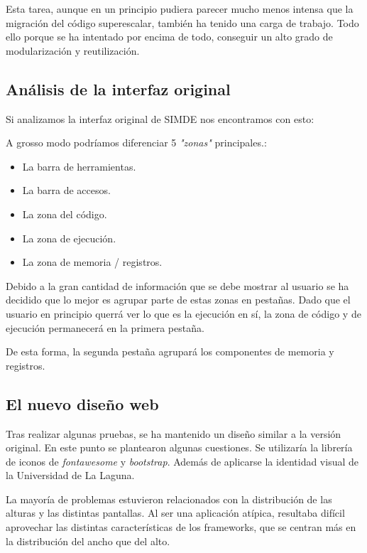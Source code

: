 Esta tarea, aunque en un principio pudiera parecer mucho menos intensa que la migración del código 
superescalar, también ha tenido una carga de trabajo. Todo ello porque se ha intentado por encima 
de todo, conseguir un alto grado de modularización y reutilización. 

\subsection{Análisis de la interfaz original}

Si analizamos la interfaz original de SIMDE nos encontramos con esto: 

A grosso modo podríamos diferenciar 5 \textit{"zonas"} principales.:

\begin{itemize}

\item La barra de herramientas.

\item La barra de accesos.

\item La zona del código.

\item La zona de ejecución.

\item La zona de memoria / registros. 

\end{itemize}

Debido a la gran cantidad de información que se debe mostrar al usuario se ha decidido que lo mejor 
es agrupar parte de estas zonas en pestañas. Dado que el usuario en principio querrá ver lo que es 
la ejecución en sí, la zona de código y de ejecución permanecerá en la primera pestaña.

\bigskip
De esta forma, la segunda pestaña agrupará los componentes de memoria y registros.

\subsection{El nuevo diseño web}

Tras realizar algunas pruebas, se ha mantenido un diseño similar a la versión original. En este punto
se plantearon algunas cuestiones. Se utilizaría la librería de iconos de \textit{fontawesome} y \textit{bootstrap}.
Además de aplicarse la identidad visual de la Universidad de La Laguna.

\bigskip
La mayoría de problemas estuvieron relacionados con la distribución de las alturas y las distintas pantallas.
Al ser una aplicación atípica, resultaba difícil aprovechar las distintas características de los frameworks, 
que se centran más en la distribución del ancho que del alto.

